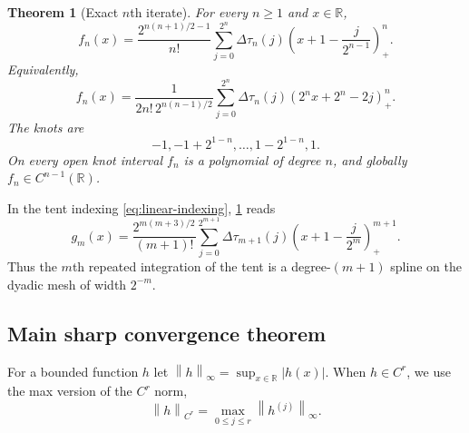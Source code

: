 \documentclass[11pt,oneside]{article}
\newtheorem{theorem}{Theorem}[section]
\theoremstyle{definition}
\theoremstyle{remark}
\newcommand{\R}{\mathbb R}
\newcommand{\norm}[1]{\left\lVert#1\right\rVert}
\newcommand{\pos}[1]{\left(#1\right)_{+}}
\begin{document}
\begin{theorem}[Exact $n$th iterate]
\label{thm:exact-iterate-intro}
For every $n\ge1$ and $x\in\R$,
\begin{equation}
 \boxed{\displaystyle
 f_n(x)=\frac{2^{n(n+1)/2-1}}{n!}
 \sum_{j=0}^{2^n}\Delta\tau_n(j)
 \pos{x+1-\frac{j}{2^{n-1}}}^{n}.}
 \label{eq:exact-iterate-intro}
\end{equation}
Equivalently,
\begin{equation}
 f_n(x)=\frac{1}{2n!\,2^{n(n-1)/2}}
 \sum_{j=0}^{2^n}\Delta\tau_n(j)
 \pos{2^nx+2^n-2j}^{n}.
 \label{eq:exact-iterate-mse-scaling}
\end{equation}
The knots are
\begin{equation}
 -1,-1+2^{1-n},\ldots,1-2^{1-n},1.
 \label{eq:iterate-knots}
\end{equation}
On every open knot interval $f_n$ is a polynomial of degree $n$, and globally
$f_n\in C^{n-1}(\R)$.
\end{theorem}

In the tent indexing \eqref{eq:linear-indexing}, \cref{thm:exact-iterate-intro} reads
\begin{equation}
 \boxed{\displaystyle
 g_m(x)=\frac{2^{m(m+3)/2}}{(m+1)!}
 \sum_{j=0}^{2^{m+1}}\Delta\tau_{m+1}(j)
 \pos{x+1-\frac{j}{2^m}}^{m+1}.}
 \label{eq:exact-tent-indexing}
\end{equation}
Thus the $m$th repeated integration of the tent is a degree-$(m+1)$ spline on the dyadic
mesh of width $2^{-m}$.

\subsection{Main sharp convergence theorem}

For a bounded function $h$ let $\norm{h}_\infty=\sup_{x\in\R}|h(x)|$.  When $h\in C^r$,
we use the max version of the $C^r$ norm,
\begin{equation}
 \norm{h}_{C^r}=\max_{0\le j\le r}\norm{h^{(j)}}_\infty.
 \label{eq:Cr-norm}
\end{equation}
\end{document}
